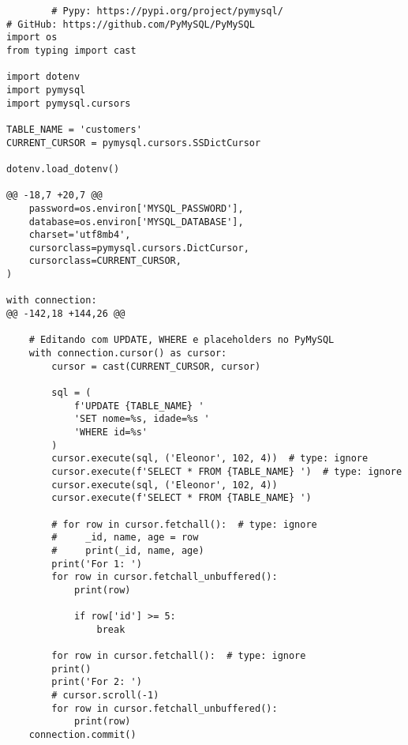 \documentclass{article}
\begin{document}
    \begin{lstlisting}
        # Pypy: https://pypi.org/project/pymysql/
# GitHub: https://github.com/PyMySQL/PyMySQL
import os
from typing import cast

import dotenv
import pymysql
import pymysql.cursors

TABLE_NAME = 'customers'
CURRENT_CURSOR = pymysql.cursors.SSDictCursor

dotenv.load_dotenv()

@@ -18,7 +20,7 @@
    password=os.environ['MYSQL_PASSWORD'],
    database=os.environ['MYSQL_DATABASE'],
    charset='utf8mb4',
    cursorclass=pymysql.cursors.DictCursor,
    cursorclass=CURRENT_CURSOR,
)

with connection:
@@ -142,18 +144,26 @@

    # Editando com UPDATE, WHERE e placeholders no PyMySQL
    with connection.cursor() as cursor:
        cursor = cast(CURRENT_CURSOR, cursor)

        sql = (
            f'UPDATE {TABLE_NAME} '
            'SET nome=%s, idade=%s '
            'WHERE id=%s'
        )
        cursor.execute(sql, ('Eleonor', 102, 4))  # type: ignore
        cursor.execute(f'SELECT * FROM {TABLE_NAME} ')  # type: ignore
        cursor.execute(sql, ('Eleonor', 102, 4))
        cursor.execute(f'SELECT * FROM {TABLE_NAME} ')

        # for row in cursor.fetchall():  # type: ignore
        #     _id, name, age = row
        #     print(_id, name, age)
        print('For 1: ')
        for row in cursor.fetchall_unbuffered():
            print(row)

            if row['id'] >= 5:
                break

        for row in cursor.fetchall():  # type: ignore
        print()
        print('For 2: ')
        # cursor.scroll(-1)
        for row in cursor.fetchall_unbuffered():
            print(row)
    connection.commit()
    \end{lstlisting}
        


    
\end{document}
